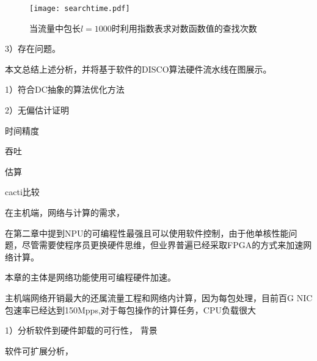 \begin{figure}[!ht]
	\centering
	\texttt{[image: searchtime.pdf]}
	\caption{当流量中包长$l=1000$时利用指数表求对数函数值的查找次数} \label{fig:searchtime}
\end{figure}



3）存在问题。

本文总结上述分析，并将基于软件的DISCO算法硬件流水线在图展示。


1）符合DC抽象的算法优化方法

2）无偏估计证明








时间精度

吞吐

估算

cacti比较











在主机端，网络与计算的需求，

在第二章中提到NPU的可编程性最强且可以使用软件控制，由于他单核性能问题，尽管需要使程序员更换硬件思维，但业界普遍已经采取FPGA的方式来加速网络计算。

本章的主体是网络功能使用可编程硬件加速。

主机端网络开销最大的还属流量工程和网络内计算，因为每包处理，目前百G NIC 包速率已经达到150Mpps,对于每包操作的计算任务，CPU负载很大

1）分析软件到硬件卸载的可行性， 背景
	
	软件可扩展分析，



	



















